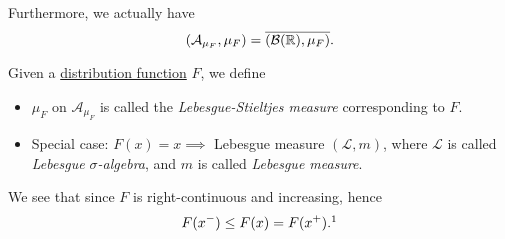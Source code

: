 Furthermore, we actually have
\[
	(\mathcal{A}_{\mu _F}, \mu _F) = \overline{(\mathcal{B} (\mathbb{\MakeUppercase{r}} ), \mu _F)}.
\]
\begin{definition}\label{def:Lebesgue-Stieltjes-measure}
	Given a \hyperref[def:distribution-function]{distribution function} \(F\), we define
	\begin{itemize}
		\item \(\mu _F\) on \(\mathcal{A} _{\mu _F}\) is called the \emph{Lebesgue-Stieltjes measure} corresponding to \(F\).
		\item Special case: \(F(x)=x\implies \) Lebesgue measure \((\mathcal{L} , m)\), where \(\mathcal{L} \) is called \emph{Lebesgue \(\sigma\)-algebra},
		      and \(m\) is called \emph{Lebesgue measure}.
	\end{itemize}
\end{definition}

\begin{note}
	We see that since \(F\) is right-continuous and increasing, hence
	\[
		F(x^-)\leq F(x) = F(x^+).\footnotemark
	\]
\end{note}

